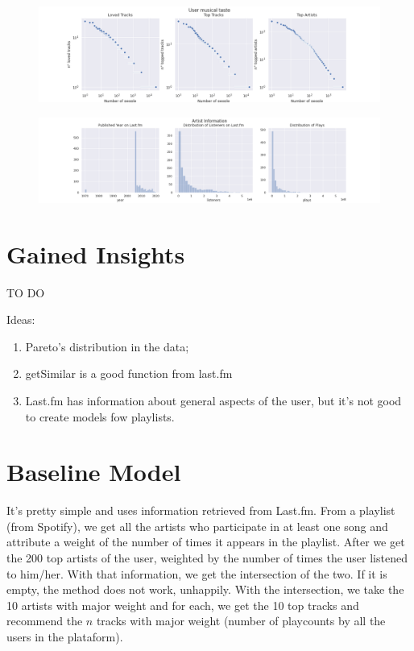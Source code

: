 \documentclass{article}
\begin{document}
\begin{figure}[!h]
  \centering
  \label{fig:top-loved}
  \includegraphics[width = \textwidth]{../../images/top-loved-tracks.png}
\end{figure}

\begin{figure}[!h]
  \centering
  \label{fig:artist-info}
  \includegraphics[width = \textwidth]{../../images/artist_info.png}
\end{figure}

\section{Gained Insights}

TO DO 

Ideas:
\begin{enumerate}
  \item Pareto's distribution in the data; 
  \item getSimilar is a good function from last.fm
  \item Last.fm has information about general aspects of the user, but it's
  not good to create models fow playlists. 
\end{enumerate}

\section{Baseline Model}

It's pretty simple and uses information retrieved from Last.fm. From a
playlist (from Spotify), we get all the artists who participate in at least
one song and attribute a weight of the number of times it appears in the playlist. After we get the 200 top artists of the user, weighted by the number of
times the user listened to him/her. With that information, we get the
intersection of the two. If it is empty, the method does not work, unhappily.
With the intersection, we take the 10 artists with major weight and for each,
we get the 10 top tracks and recommend the $n$ tracks with major weight
(number of playcounts by all the users in the plataform). 
\end{document}
